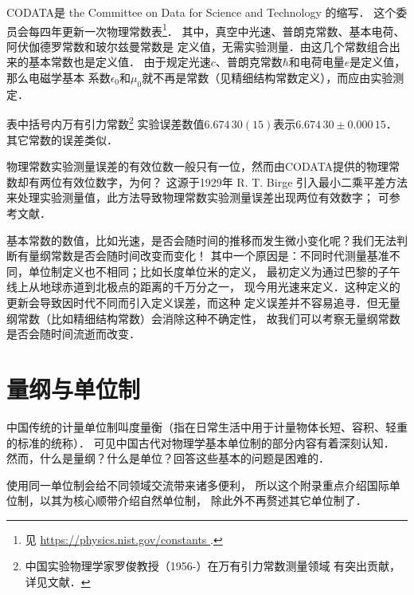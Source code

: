 CODATA是 the Committee on Data for Science and Technology 的缩写．
这个委员会每四年更新一次物理常数表{\footnote{见 \url{ https://physics.nist.gov/constants }.}}．
其中，真空中光速、普朗克常数、基本电荷、阿伏伽德罗常数和玻尔兹曼常数是
定义值，无需实验测量．由这几个常数组合出来的基本常数也是定义值．
由于规定光速$c$、普朗克常数$\hbar$和电荷电量$e$是定义值，那么电磁学基本
系数$\epsilon_0$和$\mu_0$就不再是常数（见精细结构常数定义），而应由实验测定．



表中括号内万有引力常数{\footnote{中国实验物理学家罗俊教授（1956-）在万有引力常数测量领域
有突出贡献，详见文献\parencite{luo_2018}．}}
实验误差数值$6.674\,30(15)$表示$6.674\,30\pm 0.000\,15$．
其它常数的误差类似．

物理常数实验测量误差的有效位数一般只有一位，然而由CODATA提供的物理常数却有两位有效位数字，为何？
这源于1929年 R. T. Birge 引入最小二乘平差方法
来处理实验测量值，此方法导致物理常数实验测量误差出现两位有效数字；
可参考文献\parencite{Taylor-1969-RevModPhys.41.375}．


基本常数的数值，比如光速，是否会随时间的推移而发生微小变化呢？我们无法判断有量纲常数是否会随时间改变而变化！
其中一个原因是：不同时代测量基准不同，单位制定义也不相同；比如长度单位米的定义，
最初定义为通过巴黎的子午线上从地球赤道到北极点的距离的千万分之一，
现今用光速来定义．这种定义的更新会导致因时代不同而引入定义误差，而这种
定义误差并不容易追寻．但无量纲常数（比如精细结构常数）会消除这种不确定性，
故我们可以考察无量纲常数是否会随时间流逝而改变．



\printbibliography[heading=subbibliography,title=附录\ref{chphyconst}参考文献]



















\chapter{量纲与单位制}\label{chunit-dim}
中国传统的计量单位制叫度量衡（指在日常生活中用于计量物体长短、容积、轻重的标准的统称）．
可见中国古代对物理学基本单位制的部分内容有着深刻认知．
然而，什么是量纲？什么是单位？回答这些基本的问题是困难的．

使用同一单位制会给不同领域交流带来诸多便利，
所以这个附录重点介绍国际单位制，以其为核心顺带介绍自然单位制，
除此外不再赘述其它单位制了．


